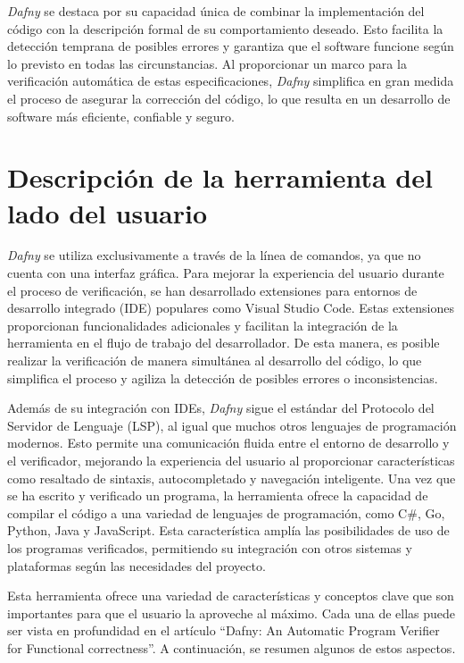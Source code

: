 \documentclass[runningheads]{llncs}
\begin{document}
\textit{Dafny} se destaca por su capacidad única de combinar la implementación del código con la descripción formal de su comportamiento
deseado. Esto facilita la detección temprana de posibles errores y garantiza que el software funcione según lo previsto en todas
las circunstancias. Al proporcionar un marco para la verificación automática de estas especificaciones, \textit{Dafny} simplifica en gran
medida el proceso de asegurar la corrección del código, lo que resulta en un desarrollo de software más eficiente, confiable y seguro.

\section{Descripción de la herramienta del lado del usuario}

\textit{Dafny} se utiliza exclusivamente a través de la línea de comandos, ya que no cuenta con una interfaz gráfica.
Para mejorar la experiencia del usuario durante el proceso de verificación, se han desarrollado extensiones para entornos de desarrollo integrado (IDE) populares como Visual Studio Code.
Estas extensiones proporcionan funcionalidades adicionales y facilitan la integración de la herramienta en el flujo de trabajo del desarrollador.
De esta manera, es posible realizar la verificación de manera simultánea al desarrollo del código, lo que simplifica el proceso y agiliza la detección de posibles errores o inconsistencias.

Además de su integración con IDEs, \textit{Dafny} sigue el estándar del Protocolo del Servidor de Lenguaje (LSP), al igual que muchos otros lenguajes de programación modernos.
Esto permite una comunicación fluida entre el entorno de desarrollo y el verificador, mejorando la experiencia del usuario al proporcionar características como resaltado de sintaxis, autocompletado y navegación inteligente.
Una vez que se ha escrito y verificado un programa, la herramienta ofrece la capacidad de compilar el código a una variedad de lenguajes de programación, como C\#, Go, Python, Java y JavaScript.
Esta característica amplía las posibilidades de uso de los programas verificados, permitiendo su integración con otros sistemas y plataformas según las necesidades del proyecto.

Esta herramienta ofrece una variedad de características y conceptos clave que son importantes para que el usuario la aproveche al máximo. 
Cada una de ellas puede ser vista en profundidad en el artículo 
``Dafny: An Automatic Program Verifier for Functional correctness''\cite{10.1007/978-3-642-17511-4_20}.
A continuación, se resumen algunos de estos aspectos.
\end{document}
